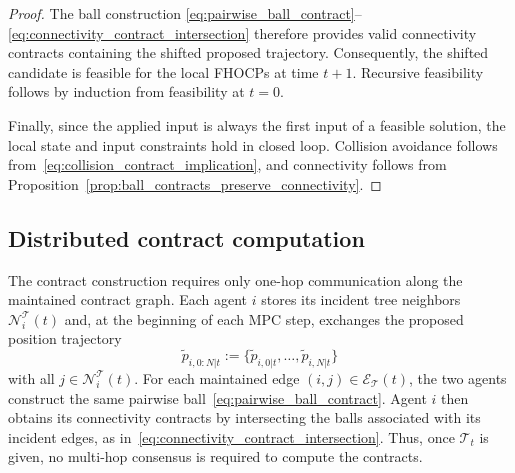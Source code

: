 \documentclass[letterpaper, 10 pt, conference]{ieeeconf}  %
\begin{document}
\begin{proof}

	The ball construction
	\eqref{eq:pairwise_ball_contract}--\eqref{eq:connectivity_contract_intersection}
	therefore provides valid connectivity contracts containing the shifted proposed
	trajectory. Consequently, the shifted candidate is feasible for the local
	FHOCPs at time $t+1$. Recursive feasibility follows by induction from
	feasibility at $t=0$.

	Finally, since the applied input is always the first input of a feasible
	solution, the local state and input constraints hold in closed loop. Collision
	avoidance follows from~\eqref{eq:collision_contract_implication}, and
	connectivity follows from Proposition~\ref{prop:ball_contracts_preserve_connectivity}.
\end{proof}


\subsection{Distributed contract computation} \label{subsec:distributed_contr}

The contract construction requires only one-hop communication along the
maintained contract graph. Each agent $i$ stores its incident tree neighbors
$\mathcal{N}^{\mathcal{T}}_i(t)$ and, at the beginning of each MPC step,
exchanges the proposed position trajectory
\[
	\tilde p_{i,0:N|t}
	:=
	\{\tilde p_{i,0|t},\ldots,\tilde p_{i,N|t}\}
\]
with all $j\in\mathcal{N}^{\mathcal{T}}_i(t)$. For each maintained edge
$(i,j)\in\mathcal{E}_{\mathcal{T}}(t)$, the two agents construct the same
pairwise ball~\eqref{eq:pairwise_ball_contract}. Agent $i$ then obtains its
connectivity contracts by intersecting the balls associated with its incident
edges, as in~\eqref{eq:connectivity_contract_intersection}. Thus, once
$\mathcal{T}_t$ is given, no multi-hop consensus is required to compute the
contracts.
\end{document}
